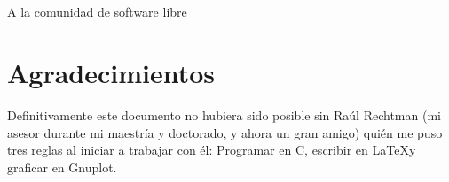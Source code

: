\chapter*{}
\thispagestyle{empty}


\begin{center}
A la comunidad  de software libre
\end{center}

\newpage
\thispagestyle{empty}
\chapter*{Agradecimientos}

Definitivamente este documento no hubiera sido posible sin  Raúl Rechtman (mi asesor durante mi maestría y doctorado, y ahora un gran amigo) quién me puso tres reglas al iniciar a trabajar con él: Programar en C, escribir en \LaTeX y graficar en Gnuplot.